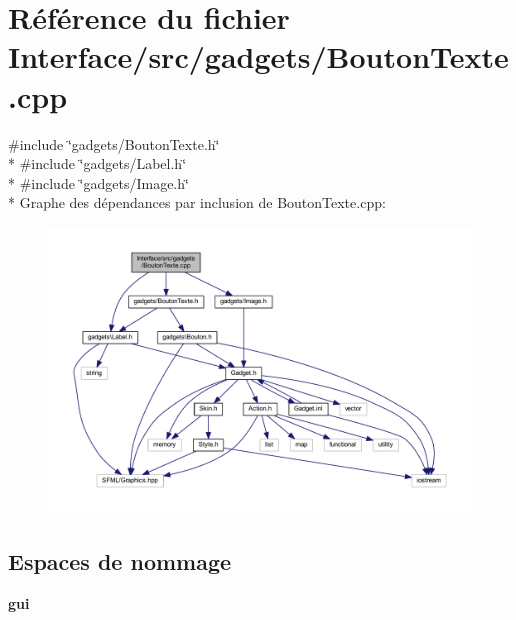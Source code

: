 \section{Référence du fichier Interface/src/gadgets/\+Bouton\+Texte.cpp}
\label{_bouton_texte_8cpp}
{\ttfamily \#include \char`\"{}gadgets/\+Bouton\+Texte.\+h\char`\"{}}\\*
{\ttfamily \#include \char`\"{}gadgets/\+Label.\+h\char`\"{}}\\*
{\ttfamily \#include \char`\"{}gadgets/\+Image.\+h\char`\"{}}\\*
Graphe des dépendances par inclusion de Bouton\+Texte.\+cpp\+:\nopagebreak
\begin{figure}[H]
\begin{center}
\leavevmode
\includegraphics[width=350pt]{_bouton_texte_8cpp__incl}
\end{center}
\end{figure}
\subsection*{Espaces de nommage}
\begin{DoxyCompactItemize}
\item 
 {\bf gui}
\end{DoxyCompactItemize}
